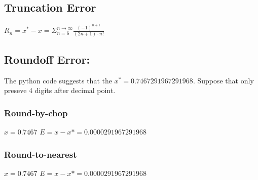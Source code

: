 \documentclass[12pt]{article}
\begin{document}
\subsection*{Truncation Error}
\begin{center}
    \(R_n = x^* - x = \Sigma_{n = 6}^{n \to \infty}\frac{{(-1)^{n+1}}}{(2n+1) \cdot n!}\)  
\end{center}
\subsection*{Roundoff Error:}
The python code suggests that the \(x^* =  0.7467291967291968.\) Suppose that only preseve 4 digits after decimal point.
\subsubsection*{Round-by-chop}
\begin{center}
    \(x = 0.7467\) \(E = x - x* = 0.0000291967291968 \)
\end{center}
\subsubsection*{Round-to-nearest}
\begin{center}
    \(x = 0.7467\) \(E = x - x* = 0.0000291967291968 \)
\end{center}
\end{document}
